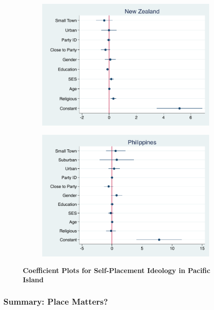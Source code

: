 \documentclass[12pt, titlepage]{article}
\newcommand\tb{\textbf}
\begin{document}
\begin{figure}[H]
	\centering
	\begin{subfigure}[b]{0.475\textwidth}
		\centering
		\includegraphics[width=\textwidth]{IdeologyCoef/NewZealand}
	\end{subfigure}
	\hfill
	\begin{subfigure}[b]{0.475\textwidth}  
		\centering 
		\includegraphics[width=\textwidth]{IdeologyCoef/Philippines}
	\end{subfigure}
	\caption[ \tb{Self-Placement Ideology - Pacific Islands} ]
	{\tb {Coefficient Plots for Self-Placement Ideology in Pacific Island} }
	\label{PacificIdeo}
\end{figure}

\subsubsection{Summary: Place Matters?}
\end{document}
